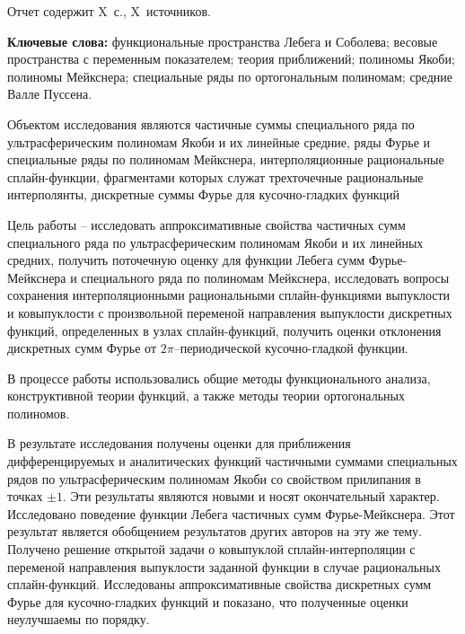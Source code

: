 \Referat %
Отчет содержит X~с., X~источников.

\textbf{ Ключевые слова:}
функциональные пространства Лебега и Соболева; 
весовые пространства с переменным показателем; 
теория приближений; 
полиномы Якоби; 
полиномы Мейкснера; 
специальные ряды по ортогональным полиномам; 
средние Валле Пуссена.


Объектом исследования являются частичные суммы специального ряда по ультрасферическим полиномам Якоби и их линейные средние, ряды Фурье и специальные ряды по полиномам Мейкснера, интерполяционные рациональные сплайн-функции, фрагментами которых служат трехточечные  рациональные интерполянты, дискретные суммы Фурье для кусочно-гладких функций

Цель работы -- исследовать аппроксимативные свойства частичных сумм специального ряда по ультрасферическим полиномам Якоби и их линейных средних, получить поточечную оценку для функции Лебега сумм Фурье-Мейкснера и специального ряда по полиномам Мейкснера, исследовать вопросы сохранения интерполяционными рациональными
сплайн-функциями выпуклости и ковыпуклости с произвольной переменой направления выпуклости дискретных функций, определенных в узлах сплайн-функций, получить оценки отклонения дискретных сумм Фурье от $2\pi$--периодической кусочно-гладкой функции.

В процессе работы использовались общие методы функционального анализа, конструктивной теории функций, а также методы теории ортогональных полиномов.

В результате исследования получены оценки для приближения дифференцируемых и аналитических функций частичными суммами специальных рядов по ультрасферическим полиномам Якоби со свойством прилипания в точках $\pm1$. Эти результаты являются новыми и носят окончательный характер. 
Исследовано поведение функции Лебега частичных сумм Фурье-Мейкснера. Этот результат является обобщением результатов других авторов на эту же тему.
Получено решение открытой задачи о ковыпуклой сплайн-интерполяции с переменой направления выпуклости заданной функции в случае рациональных сплайн-функций.
Исследованы аппроксимативные свойства дискретных сумм Фурье для кусочно-гладких функций и показано, что полученные оценки неулучшаемы по порядку.


